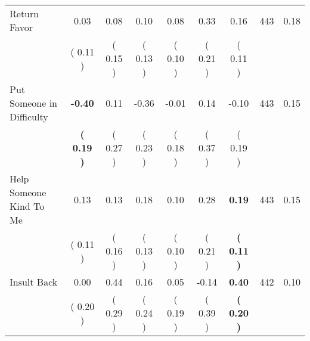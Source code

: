 \begin{tabular}{lcccccccc}
Return Favor &      0.03 &      0.08 &      0.10 &      0.08 &      0.33 &      0.16 & 443 &       0.18 \\ 
 & (     0.11 ) & (     0.15 ) & (     0.13 ) & (     0.10 ) & (     0.21 ) & (     0.11 ) & \\
Put Someone in Difficulty & \textbf{    -0.40} &      0.11 &     -0.36 &     -0.01 &      0.14 &     -0.10 & 443 &       0.15 \\ 
 & \textbf{(     0.19 )} & (     0.27 ) & (     0.23 ) & (     0.18 ) & (     0.37 ) & (     0.19 ) & \\
Help Someone Kind To Me &      0.13 &      0.13 &      0.18 &      0.10 &      0.28 & \textbf{     0.19} & 443 &       0.15 \\ 
 & (     0.11 ) & (     0.16 ) & (     0.13 ) & (     0.10 ) & (     0.21 ) & \textbf{(     0.11 )} & \\
Insult Back &      0.00 &      0.44 &      0.16 &      0.05 &     -0.14 & \textbf{     0.40} & 442 &       0.10 \\ 
 & (     0.20 ) & (     0.29 ) & (     0.24 ) & (     0.19 ) & (     0.39 ) & \textbf{(     0.20 )} & \\
\bottomrule
\end{tabular}
